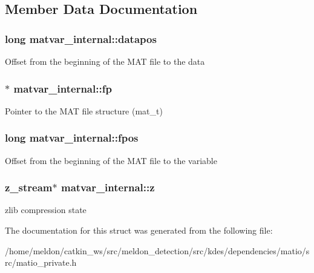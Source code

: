 \subsection{Member Data Documentation}
\hypertarget{structmatvar__internal_afd3bfaab126a160bd6855563e1ea0a7e}{
\subsubsection[{datapos}]{\setlength{\rightskip}{0pt plus 5cm}long matvar\-\_\-internal\-::datapos}}\label{structmatvar__internal_afd3bfaab126a160bd6855563e1ea0a7e}
Offset from the beginning of the M\-A\-T file to the data \hypertarget{structmatvar__internal_a73f9faaa71fa20ca1cb48e32bcc67351}{
\subsubsection[{fp}]{$\ast$ matvar\-\_\-internal\-::fp}}\label{structmatvar__internal_a73f9faaa71fa20ca1cb48e32bcc67351}
Pointer to the M\-A\-T file structure (mat\-\_\-t) \hypertarget{structmatvar__internal_af64eef69fa4be3b068789d816dedd619}{
\subsubsection[{fpos}]{\setlength{\rightskip}{0pt plus 5cm}long matvar\-\_\-internal\-::fpos}}\label{structmatvar__internal_af64eef69fa4be3b068789d816dedd619}
Offset from the beginning of the M\-A\-T file to the variable \hypertarget{structmatvar__internal_a65fb91d70ebba50dd69f6433a5ef2461}{
\subsubsection[{z}]{\setlength{\rightskip}{0pt plus 5cm}z\-\_\-stream$\ast$ matvar\-\_\-internal\-::z}}\label{structmatvar__internal_a65fb91d70ebba50dd69f6433a5ef2461}
zlib compression state 

The documentation for this struct was generated from the following file\-:\begin{DoxyCompactItemize}
\item 
/home/meldon/catkin\-\_\-ws/src/meldon\-\_\-detection/src/kdes/dependencies/matio/src/matio\-\_\-private.\-h\end{DoxyCompactItemize}
